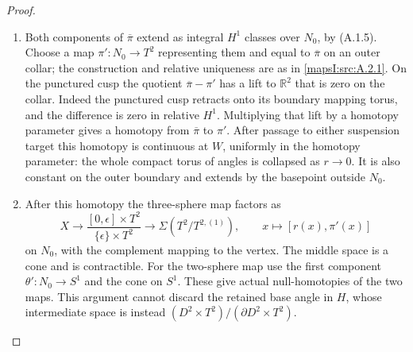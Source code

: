 \begin{proof}
\begin{enumerate}[label=\arabic*.,leftmargin=*]
\item Both components of $\overline\pi$ extend as integral
$H^1$ classes over $N_0$, by (A.1.5).  Choose a map
$\pi':N_0\to T^2$ representing them and equal to
$\overline\pi$ on an outer collar; the construction
and relative uniqueness are as in \cref{mapsI:src:A.2.1}.  On the
punctured cusp the quotient $\overline\pi-\pi'$ has
a lift to $\mathbb R^2$ that is zero on the collar.
Indeed the punctured cusp retracts onto its boundary
mapping torus, and the difference is zero in relative
$H^1$.  Multiplying that lift by a homotopy parameter
gives a homotopy from $\overline\pi$ to $\pi'$.
After passage to either suspension target this
homotopy is continuous at $W$, uniformly in the
homotopy parameter: the whole compact torus of
angles is collapsed as $r\to0$.  It is also constant
on the outer boundary and extends by the basepoint
outside $N_0$.

\item After this homotopy the three-sphere map factors as
\[
 X\longrightarrow
 \frac{[0,\epsilon]\times T^2}{\{\epsilon\}\times T^2}
 \longrightarrow\Sigma(T^2/T^{2,(1)}),
 \qquad x\longmapsto[r(x),\pi'(x)]
\]
on $N_0$, with the complement mapping to the vertex.
The middle space is a cone and is contractible.
For the two-sphere map use the first component
$\theta':N_0\to S^1$ and the cone on $S^1$.
These give actual null-homotopies of the two maps.
This argument cannot discard the retained base
angle in $H$, whose intermediate space is instead
$(D^2\times T^2)/(\partial D^2\times T^2)$.
\end{enumerate}
\end{proof}

